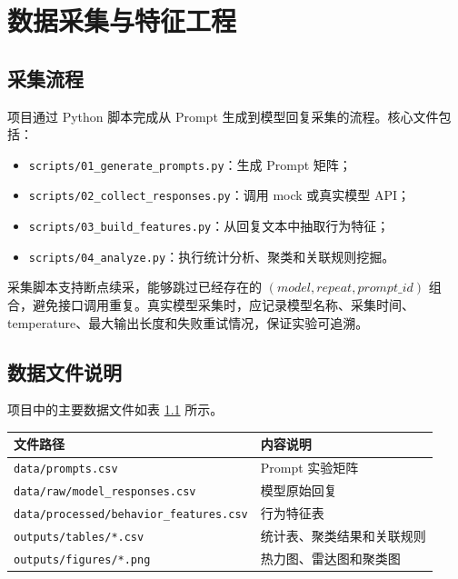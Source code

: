 
\chapter{数据采集与特征工程}

\section{采集流程}

项目通过 Python 脚本完成从 Prompt 生成到模型回复采集的流程。核心文件包括：

\begin{itemize}
    \item \texttt{scripts/01\_generate\_prompts.py}：生成 Prompt 矩阵；
    \item \texttt{scripts/02\_collect\_responses.py}：调用 mock 或真实模型 API；
    \item \texttt{scripts/03\_build\_features.py}：从回复文本中抽取行为特征；
    \item \texttt{scripts/04\_analyze.py}：执行统计分析、聚类和关联规则挖掘。
\end{itemize}

采集脚本支持断点续采，能够跳过已经存在的 $(model, repeat, prompt\_id)$ 组合，避免接口调用重复。真实模型采集时，应记录模型名称、采集时间、temperature、最大输出长度和失败重试情况，保证实验可追溯。

\section{数据文件说明}

项目中的主要数据文件如表 \ref{tab:data-files} 所示。

\begin{table}[htbp]
    \centering
    \begin{tabular}{ll}
        \toprule
        文件路径 & 内容说明 \\
        \midrule
        \texttt{data/prompts.csv} & Prompt 实验矩阵 \\
        \texttt{data/raw/model\_responses.csv} & 模型原始回复 \\
        \texttt{data/processed/behavior\_features.csv} & 行为特征表 \\
        \texttt{outputs/tables/*.csv} & 统计表、聚类结果和关联规则 \\
        \texttt{outputs/figures/*.png} & 热力图、雷达图和聚类图 \\
        \bottomrule
    \end{tabular}
    \label{tab:data-files}
\end{table}

